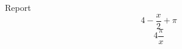 \documentclass[]{report}
\begin{document}
Report\\
$$4 - \frac{x}{2}  + \pi$$$$4 \frac{\pi}{x} $$
\end{document}
